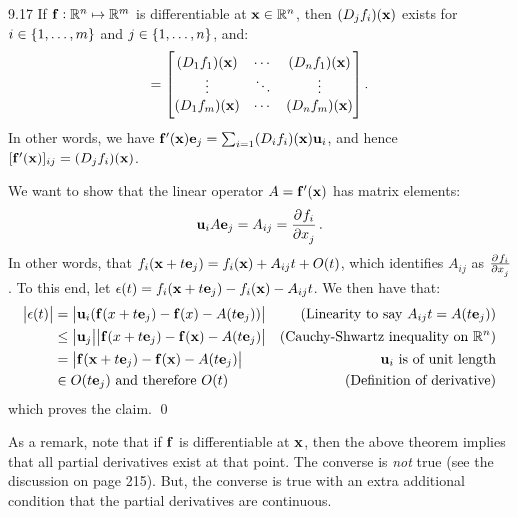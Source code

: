 \begin{theorem}{}{9.17}
    If $\mathbf{f}: \mathbb{R}^n \mapsto \mathbb{R}^m$ is differentiable at $\mathbf{x} \in \mathbb{R}^n$, then $(D_jf_i)(\mathbf{x})$ exists for $i \in \set{1, \ldots, m}$ and $j \in \set{1, \ldots, n}$, and:
    \begin{align*}
        [\v{f}'(\v{x})] = \m{(D_1f_1)(\v{x}) & \cdots & (D_nf_1)(\v{x})
        \\ \vdots & \ddots & \vdots
        \\ (D_1f_m)(\v{x}) & \cdots & (D_nf_m)(\v{x})}.
    \end{align*}
    In other words, we have $\mathbf{f}'(\mathbf{x})\mathbf{e}_j = \sum_{i=1} (D_if_i)(\mathbf{x})\mathbf{u}_i$, and hence $[\mathbf{f}'(\mathbf{x})]_{ij} = (D_jf_i)(\mathbf{x})$. 
\end{theorem}
\begin{nproof}
    We want to show that the linear operator $A = \mathbf{f}'(\mathbf{x})$ has matrix elements:
    \begin{align*}
        \v{u}_iA\v{e}_j = A_{ij} = \dpd{f_i}{x_j}.
    \end{align*}
    In other words, that $f_i(\mathbf{x} + t\mathbf{e}_j) = f_i(\mathbf{x}) + A_{ij}t + O(t)$, which identifies $A_{ij}$ as $\pd{f_i}{x_j}$. To this end, let $\epsilon(t) = f_i(\mathbf{x} + t\mathbf{e}_j) - f_i(\mathbf{x}) - A_{ij}t$. We then have that:
    \begin{align*}
        \abs{\epsilon(t)} &= \abs{\mathbf{u}_i(\mathbf{f}(x + t\mathbf{e}_j) - \mathbf{f}(x) - A(t\mathbf{e}_j))} & \text{(Linearity to say $A_{ij}t = A(t\mathbf{e}_j)$)}
        \\ &\leq \abs{\mathbf{u}_j}\abs{\mathbf{f}(x + t\mathbf{e}_j) - \mathbf{f}(\mathbf{x}) - A(t\mathbf{e}_j)} & \text{(Cauchy-Shwartz inequality on $\mathbb{R}^n$)}
        \\ &= \abs{\mathbf{f}(\mathbf{x} + t\mathbf{e}_j) - \mathbf{f}(\mathbf{x}) - A(t\mathbf{e}_j)} & \text{$\mathbf{u}_i$ is of unit length}
        \\ &\in O(t\mathbf{e}_j) \text{ and therefore } O(t) & \text{(Definition of derivative)}
    \end{align*}
    which proves the claim. \qed
\end{nproof}
\noindent As a remark, note that if $\mathbf{f}$ is differentiable at $\mathbf{x}$, then the above theorem implies that all partial derivatives exist at that point. The converse is \emph{not} true (see the discussion on page 215). But, the converse is true with an extra additional condition that the partial derivatives are continuous.

